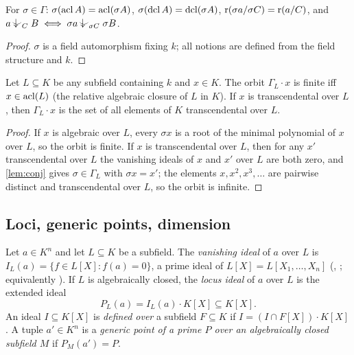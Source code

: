 \begin{lemma}[equivariance]\label{lem:equiv}
For $\sigma\in\Gamma$: $\sigma(\operatorname{acl} A)=\operatorname{acl}(\sigma A)$, $\sigma(\operatorname{dcl} A)=\operatorname{dcl}(\sigma A)$,
$\operatorname{r}(\sigma a/\sigma C)=\operatorname{r}(a/C)$, and $a\ind{C}B\iff\sigma a\ind{\sigma C}\sigma B$.
\end{lemma}
\begin{proof}
$\sigma$ is a field automorphism fixing $k$; all notions are defined from the field
structure and $k$.
\end{proof}

\begin{lemma}\label{lem:orbit}
Let $L\subseteq K$ be any subfield containing $k$ and $x\in K$.  The orbit
$\Gamma_L\cdot x$ is finite iff $x\in\operatorname{acl}(L)$ (the relative algebraic closure of $L$ in
$K$).  If $x$ is transcendental over $L$, then $\Gamma_L\cdot x$ is the set of all
elements of $K$ transcendental over $L$.
\end{lemma}
\begin{proof}
If $x$ is algebraic over $L$, every $\sigma x$ is a root of the minimal polynomial of
$x$ over $L$, so the orbit is finite.  If $x$ is transcendental over $L$, then for any
$x'$ transcendental over $L$ the vanishing ideals of $x$ and $x'$ over $L$ are both
zero, and \cref{lem:conj} gives $\sigma\in\Gamma_L$ with $\sigma x=x'$; the elements
$x,x^2,x^3,\dots$ are pairwise distinct and transcendental over $L$, so the orbit is
infinite.
\end{proof}

\subsection{Loci, generic points, dimension}

\begin{definition}[loci]\label{def:locus}
Let $a\in K^n$ and let $L\subseteq K$ be a subfield.  The \emph{vanishing ideal} of $a$
over $L$ is $I_L(a)=\{f\in L[X]: f(a)=0\}$, a prime ideal of $L[X]=L[X_1,\dots,X_n]$
(, ; equivalently
).  If $L$ is algebraically closed, the
\emph{locus ideal} of $a$ over $L$ is the extended ideal
\[
  P_L(a)=I_L(a)\cdot K[X]\subseteq K[X].
\]
An ideal $I\subseteq K[X]$ is \emph{defined over} a subfield $F\subseteq K$ if
$I=(I\cap F[X])\cdot K[X]$.  A tuple $a'\in K^n$ is a \emph{generic point of a prime $P$
over an algebraically closed subfield $M$} if $P_M(a')=P$.
\end{definition}

